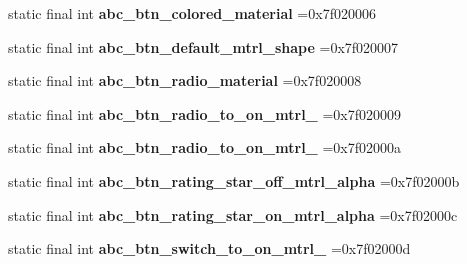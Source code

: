 \begin{DoxyCompactItemize}
\mbox{\label{classproject4_1_1xaria_1_1R_1_1drawable_a66c0940bb7b0eb1f0090c5aa2c2ce68c}} 
static final int {\bfseries abc\+\_\+btn\+\_\+colored\+\_\+material} =0x7f020006
\item 
\mbox{\label{classproject4_1_1xaria_1_1R_1_1drawable_a8289332c5d7f0781a72417d49470f40f}} 
static final int {\bfseries abc\+\_\+btn\+\_\+default\+\_\+mtrl\+\_\+shape} =0x7f020007
\item 
\mbox{\label{classproject4_1_1xaria_1_1R_1_1drawable_a98e162e6fbd7fda709776bbe07afe0cf}} 
static final int {\bfseries abc\+\_\+btn\+\_\+radio\+\_\+material} =0x7f020008
\item 
\mbox{\label{classproject4_1_1xaria_1_1R_1_1drawable_a3e7bca8f1180c8da68f15b0568d41a54}} 
static final int {\bfseries abc\+\_\+btn\+\_\+radio\+\_\+to\+\_\+on\+\_\+mtrl\+\_} =0x7f020009
\item 
\mbox{\label{classproject4_1_1xaria_1_1R_1_1drawable_aec0843ca20b3f8b2b2095f2fd0c4b075}} 
static final int {\bfseries abc\+\_\+btn\+\_\+radio\+\_\+to\+\_\+on\+\_\+mtrl\+\_} =0x7f02000a
\item 
\mbox{\label{classproject4_1_1xaria_1_1R_1_1drawable_af9f881bb713180c15e4e4a97b3825c63}} 
static final int {\bfseries abc\+\_\+btn\+\_\+rating\+\_\+star\+\_\+off\+\_\+mtrl\+\_\+alpha} =0x7f02000b
\item 
\mbox{\label{classproject4_1_1xaria_1_1R_1_1drawable_ae97b387e6e17b17ef757c247e22e1b73}} 
static final int {\bfseries abc\+\_\+btn\+\_\+rating\+\_\+star\+\_\+on\+\_\+mtrl\+\_\+alpha} =0x7f02000c
\item 
\mbox{\label{classproject4_1_1xaria_1_1R_1_1drawable_ae537caf04fdbaaffcb7d8b9c02fe3f4c}} 
static final int {\bfseries abc\+\_\+btn\+\_\+switch\+\_\+to\+\_\+on\+\_\+mtrl\+\_} =0x7f02000d
\item 
\mbox{\label{classproject4_1_1xaria_1_1R_1_1drawable_ad3441f42cc07fa4ba2e636be0d6b64bc}} 

\end{DoxyCompactItemize}
